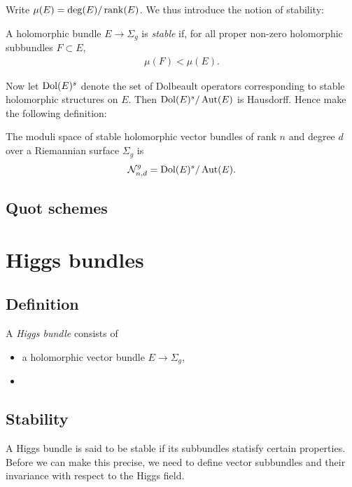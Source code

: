 \documentclass{article}
\begin{document}
Write $\mu(E) = \deg(E)/\operatorname{rank}(E)$. We thus introduce the notion of
stability:

\begin{definition}
  A holomorphic bundle $E\to\Sigma_g$ is \emph{stable} if,
  for all proper non-zero holomorphic subbundles $F\subset E$,
  \begin{align*}
    \mu(F) < \mu(E).
  \end{align*}
\end{definition}

Now let $\operatorname{Dol}(E)^s$ denote the set of Dolbeault operators corresponding
to stable holomorphic structures on $E$. Then $\operatorname{Dol}(E)^s/\operatorname{Aut}(E)$
is Hausdorff. Hence make the following definition:

\begin{definition}
  The moduli space of stable holomorphic vector bundles of rank $n$
  and degree $d$ over a Riemannian surface $\Sigma_g$ is
  \begin{align*}
    \mathcal N^g_{n,d} = \operatorname{Dol}(E)^s / \operatorname{Aut}(E).
  \end{align*}
\end{definition}

\subsection{Quot schemes}

\section{Higgs bundles}

\subsection{Definition}

\begin{definition}
  A \emph{Higgs bundle} consists of
  \begin{itemize}
    \item a holomorphic vector bundle $E\to\Sigma_g$,
    \item
  \end{itemize}
\end{definition}

\subsection{Stability}

A Higgs bundle is said to be stable if its subbundles statisfy certain
properties. Before we can make this precise, we need to define
vector subbundles and their invariance with respect to the Higgs field.
\end{document}
